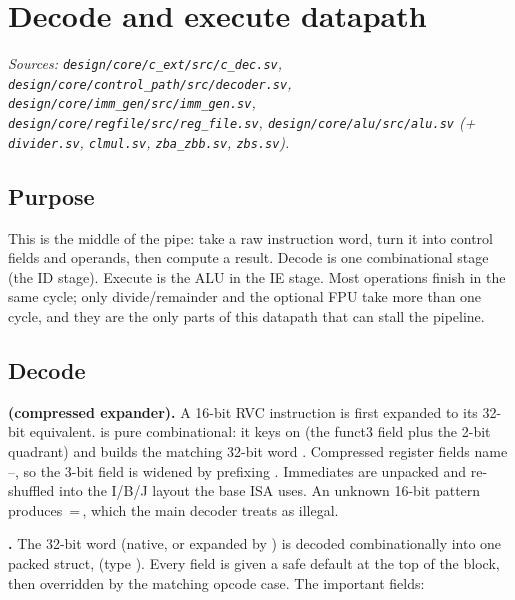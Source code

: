 \section{Decode and execute datapath}
{\sloppy\textit{Sources: \texttt{design/core/c\_ext/src/c\_dec.sv},
\texttt{design/core/control\_path/src/decoder.sv},
\texttt{design/core/imm\_gen/src/imm\_gen.sv},
\texttt{design/core/regfile/src/reg\_file.sv},
\texttt{design/core/alu/src/alu.sv} (+ \texttt{divider.sv}, \texttt{clmul.sv},
\texttt{zba\_zbb.sv}, \texttt{zbs.sv}).}\par}

\subsection{Purpose}
This is the middle of the pipe: take a raw instruction word, turn it into control
fields and operands, then compute a result. Decode is one combinational stage (the
ID stage). Execute is the ALU in the IE stage. Most operations finish in the same
cycle; only divide/remainder and the optional FPU take more than one cycle, and
they are the only parts of this datapath that can stall the pipeline.


\subsection{Decode}
\textbf{ (compressed expander).} A 16-bit RVC instruction is first
expanded to its 32-bit equivalent.  is pure combinational: it keys on
 (the funct3 field plus the 2-bit quadrant)
and builds the matching 32-bit word . Compressed register fields name
--, so the 3-bit field is widened by prefixing .
Immediates are unpacked and re-shuffled into the I/B/J layout the base ISA uses. An
unknown 16-bit pattern produces \,=\,, which the main decoder
treats as illegal.

\textbf{.} The 32-bit word (native, or expanded by ) is
decoded combinationally into one packed struct, 
(type ). Every field is given a safe default at the top of the
block, then overridden by the matching opcode case. The important fields:

